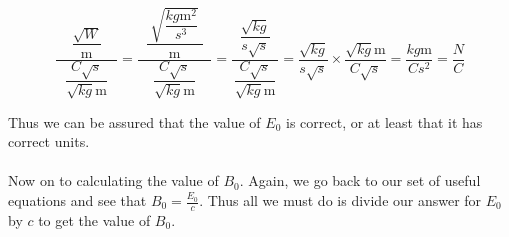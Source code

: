 \begin{equation*}
	\dfrac{\;\;\;\;\dfrac{\sqrt{W}}{\mathrm{m}}\;\;\;\;}{\dfrac{C \sqrt{s}}{\sqrt{kg} \mathrm{m}}} = 
	\dfrac
	{
		\;\;
		\dfrac
		{
			\;
			\sqrt
			{
				\dfrac
				{
					kg\mathrm{m}^2
				}
				{
					s^3
				}
			}
			\;
		}
		{
			\mathrm{m}
		}
		\;\;
	}
	{
		\dfrac
		{
			C \sqrt{s}
		}
		{
			\sqrt{kg} \mathrm{m}
		}
	} 
	= 
	\dfrac
	{
		\;\;
		\dfrac
		{
			\sqrt{kg}
		}
		{
			s
			\sqrt{s}
		}
		\;\;
	}
	{
		\dfrac
		{
			C \sqrt{s}
		}
		{
			\sqrt{kg} \mathrm{m}
		}
	} 
	=
	\dfrac
	{
		\sqrt{kg}
	}
	{
		s
		\sqrt{s}
	}
	\times
	\dfrac
	{
		\sqrt{kg} \mathrm{m}
	}
	{
		C \sqrt{s}
	}
	=
	\dfrac
	{
		kg
		\mathrm{m}
	}
	{
		C
		s^2
	}
	=
	\dfrac{N}{C}
\end{equation*}

Thus we can be assured that the value of $E_0$ is correct, or at least that it has correct units.
\\
\\ 
Now on to calculating the value of $B_0$. Again, we go back to our set of useful equations and see that $B_0 = \frac{E_0}{c}$. Thus all we must 
do is divide our answer for $E_0$ by $c$ to get the value of $B_0$.

